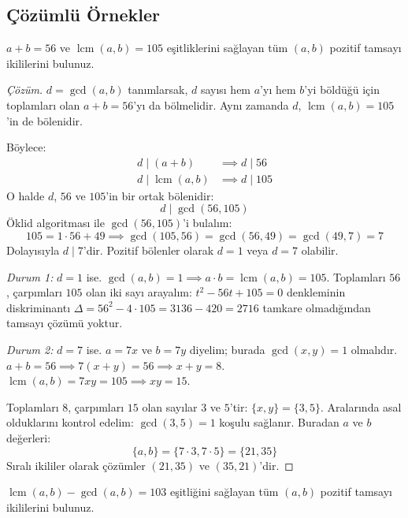 \subsection*{Çözümlü Örnekler}

\begin{example}
$a + b = 56$ ve $\operatorname{lcm}(a, b) = 105$ eşitliklerini sağlayan tüm $(a, b)$ pozitif tamsayı ikililerini bulunuz.
\end{example}

\begin{proof}[Çözüm]
$d = \gcd(a, b)$ tanımlarsak, $d$ sayısı hem $a$'yı hem $b$'yi böldüğü için toplamları olan $a+b = 56$'yı da bölmelidir. Aynı zamanda $d$, $\operatorname{lcm}(a, b) = 105$'in de bölenidir.

Böylece:
\begin{align*}
    d \mid (a + b) &\implies d \mid 56 \\
    d \mid \operatorname{lcm}(a, b) &\implies d \mid 105
\end{align*}
O halde $d$, $56$ ve $105$'in bir ortak bölenidir:
\[ d \mid \gcd(56, 105) \]
Öklid algoritması ile $\gcd(56, 105)$'i bulalım:
\[ 105 = 1 \cdot 56 + 49 \implies \gcd(105, 56) = \gcd(56, 49) = \gcd(49, 7) = 7 \]
Dolayısıyla $d \mid 7$'dir. Pozitif bölenler olarak $d = 1$ veya $d = 7$ olabilir.

\textit{Durum 1:} $d = 1$ ise.
$\gcd(a, b) = 1 \implies a \cdot b = \operatorname{lcm}(a, b) = 105$.
Toplamları $56$, çarpımları $105$ olan iki sayı arayalım:
$t^2 - 56t + 105 = 0$ denkleminin diskriminantı $\Delta = 56^2 - 4 \cdot 105 = 3136 - 420 = 2716$ tamkare olmadığından tamsayı çözümü yoktur.

\textit{Durum 2:} $d = 7$ ise.
$a = 7x$ ve $b = 7y$ diyelim; burada $\gcd(x, y) = 1$ olmalıdır.
$a + b = 56 \implies 7(x + y) = 56 \implies x + y = 8$.
$\operatorname{lcm}(a, b) = 7xy = 105 \implies xy = 15$.

Toplamları $8$, çarpımları $15$ olan sayılar $3$ ve $5$'tir:
$\{x, y\} = \{3, 5\}$.
Aralarında asal olduklarını kontrol edelim: $\gcd(3, 5) = 1$ koşulu sağlanır.
Buradan $a$ ve $b$ değerleri:
\[ \{a, b\} = \{7 \cdot 3, 7 \cdot 5\} = \{21, 35\} \]
Sıralı ikililer olarak çözümler $(21, 35)$ ve $(35, 21)$'dir.
\end{proof}

\begin{example}
$\operatorname{lcm}(a, b) - \gcd(a, b) = 103$ eşitliğini sağlayan tüm $(a, b)$ pozitif tamsayı ikililerini bulunuz.
\end{example}

